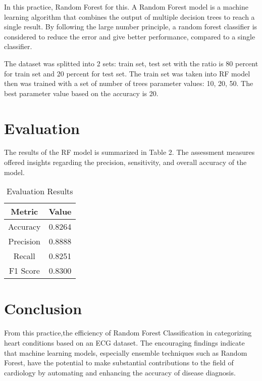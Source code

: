 \documentclass{article}
\begin{document}
In this practice, Random Forest for this. A Random Forest model is a machine learning algorithm that combines the output of multiple decision trees to reach a single result. By following the large number principle, a random forest classifier is considered to reduce the error and give better performance, compared to a single classifier.

The dataset was splitted into 2 sets: train set, test set with the ratio is 80 percent for train set and 20 percent for test set. The train set was taken into RF model then was trained with a set of number of trees parameter values: 10, 20, 50. The best parameter value based on the accuracy is 20.

\section{Evaluation}
The results of the RF model is summarized in Table 2. The assessment measures offered insights regarding the precision, sensitivity, and overall accuracy of the model.
\begin{table}[h]
    \centering
    \label{tab:evaluation}
    \begin{tabular}{|c|c|}
        \hline
        Metric & Value \\
        \hline
        Accuracy & 0.8264 \\
        Precision & 0.8888 \\
        Recall & 0.8251 \\
        F1 Score & 0.8300 \\
        \hline
    \end{tabular}
    \caption{Evaluation Results}
\end{table}

\section{Conclusion}
From this practice,the efficiency of Random Forest Classification in categorizing heart conditions based on an ECG dataset. The encouraging findings indicate that machine learning models, especially ensemble techniques such as Random Forest, have the potential to make substantial contributions to the field of cardiology by automating and enhancing the accuracy of disease diagnosis.
\end{document}
